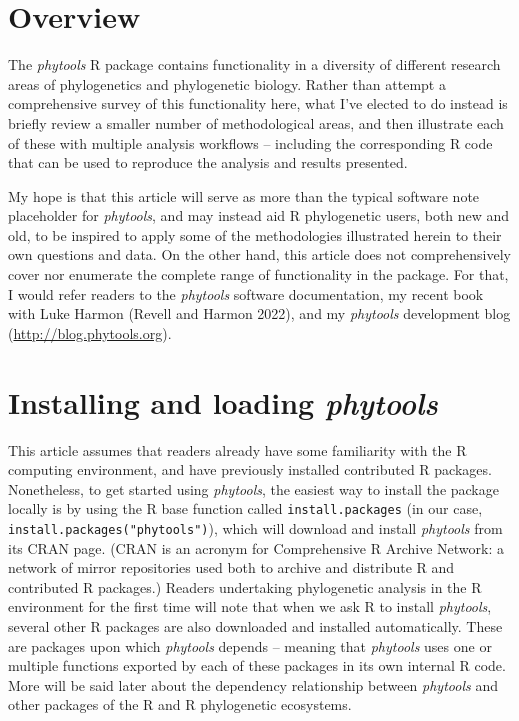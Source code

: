 \documentclass[fleqn,10pt,lineno]{wlpeerj} %
\begin{document}
\hypertarget{overview}{%
\section{Overview}\label{overview}}

The \emph{phytools} R package contains functionality in a diversity of different research areas of phylogenetics and phylogenetic biology. Rather than attempt a comprehensive survey of this functionality here, what I've elected to do instead is briefly review a smaller number of methodological areas, and then illustrate each of these with multiple analysis workflows -- including the corresponding R code that can be used to reproduce the analysis and results presented.

My hope is that this article will serve as more than the typical software note placeholder for \emph{phytools}, and may instead aid R phylogenetic users, both new and old, to be inspired to apply some of the methodologies illustrated herein to their own questions and data. On the other hand, this article does not comprehensively cover nor enumerate the complete range of functionality in the package. For that, I would refer readers to the \emph{phytools} software documentation, my recent book with Luke Harmon (Revell and Harmon 2022), and my \emph{phytools} development blog (\url{http://blog.phytools.org}).

\hypertarget{installing-and-loading-phytools}{%
\section{\texorpdfstring{Installing and loading \emph{phytools}}{Installing and loading phytools}}\label{installing-and-loading-phytools}}

This article assumes that readers already have some familiarity with the R computing environment, and have previously installed contributed R packages. Nonetheless, to get started using \emph{phytools}, the easiest way to install the package locally is by using the R base function called \texttt{install.packages} (in our case, \texttt{install.packages("phytools")}), which will download and install \emph{phytools} from its CRAN page. (CRAN is an acronym for Comprehensive R Archive Network: a network of mirror repositories used both to archive and distribute R and contributed R packages.) Readers undertaking phylogenetic analysis in the R environment for the first time will note that when we ask R to install \emph{phytools}, several other R packages are also downloaded and installed automatically. These are packages upon which \emph{phytools} depends -- meaning that \emph{phytools} uses one or multiple functions exported by each of these packages in its own internal R code. More will be said later about the dependency relationship between \emph{phytools} and other packages of the R and R phylogenetic ecosystems.
\end{document}
